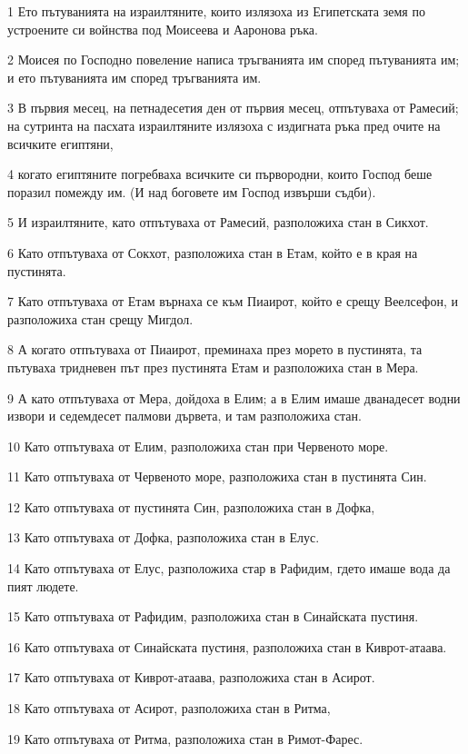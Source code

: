 \par 1 Ето пътуванията на израилтяните, които излязоха из Египетската земя по устроените си войнства под Моисеева и Ааронова ръка.
\par 2 Моисея по Господно повеление написа тръгванията им според пътуванията им; и ето пътуванията им според тръгванията им.
\par 3 В първия месец, на петнадесетия ден от първия месец, отпътуваха от Рамесий; на сутринта на пасхата израилтяните излязоха с издигната ръка пред очите на всичките египтяни,
\par 4 когато египтяните погребваха всичките си първородни, които Господ беше поразил помежду им. (И над боговете им Господ извърши съдби).
\par 5 И израилтяните, като отпътуваха от Рамесий, разположиха стан в Сикхот.
\par 6 Като отпътуваха от Сокхот, разположиха стан в Етам, който е в края на пустинята.
\par 7 Като отпътуваха от Етам върнаха се към Пиаирот, който е срещу Веелсефон, и разположиха стан срещу Мигдол.
\par 8 А когато отпътуваха от Пиаирот, преминаха през морето в пустинята, та пътуваха тридневен път през пустинята Етам и разположиха стан в Мера.
\par 9 А като отпътуваха от Мера, дойдоха в Елим; а в Елим имаше дванадесет водни извори и седемдесет палмови дървета, и там разположиха стан.
\par 10 Като отпътуваха от Елим, разположиха стан при Червеното море.
\par 11 Като отпътуваха от Червеното море, разположиха стан в пустинята Син.
\par 12 Като отпътуваха от пустинята Син, разположиха стан в Дофка,
\par 13 Като отпътуваха от Дофка, разположиха стан в Елус.
\par 14 Като отпътуваха от Елус, разположиха стар в Рафидим, гдето имаше вода да пият людете.
\par 15 Като отпътуваха от Рафидим, разположиха стан в Синайската пустиня.
\par 16 Като отпътуваха от Синайската пустиня, разположиха стан в Киврот-атаава.
\par 17 Като отпътуваха от Киврот-атаава, разположиха стан в Асирот.
\par 18 Като отпътуваха от Асирот, разположиха стан в Ритма,
\par 19 Като отпътуваха от Ритма, разположиха стан в Римот-Фарес.
